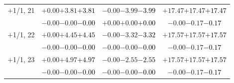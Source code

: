 \documentclass[compress]{beamer}
\begin{document}
\begin{frame}
\begin{tabular}{r | c | c | c}
$+$1/1, 21 & $+0.00$\hspace{0.1 cm}$+3.81$\hspace{0.1 cm}\textcolor{black}{$+3.81$} & $-0.00$\hspace{0.1 cm}$-3.99$\hspace{0.1 cm}\textcolor{black}{$-3.99$} & $+17.47$\hspace{0.1 cm}$+17.47$\hspace{0.1 cm}\textcolor{black}{$+17.47$} \\
           & $-0.00$\hspace{0.1 cm}$-0.00$\hspace{0.1 cm}\textcolor{black}{$-0.00$} & $+0.00$\hspace{0.1 cm}$+0.00$\hspace{0.1 cm}\textcolor{black}{$+0.00$} & $-0.00$\hspace{0.1 cm}$-0.17$\hspace{0.1 cm}\textcolor{black}{$-0.17$} \\
$+$1/1, 22 & $+0.00$\hspace{0.1 cm}$+4.45$\hspace{0.1 cm}\textcolor{black}{$+4.45$} & $-0.00$\hspace{0.1 cm}$-3.32$\hspace{0.1 cm}\textcolor{black}{$-3.32$} & $+17.57$\hspace{0.1 cm}$+17.57$\hspace{0.1 cm}\textcolor{black}{$+17.57$} \\
           & $-0.00$\hspace{0.1 cm}$-0.00$\hspace{0.1 cm}\textcolor{black}{$-0.00$} & $-0.00$\hspace{0.1 cm}$-0.00$\hspace{0.1 cm}\textcolor{black}{$-0.00$} & $-0.00$\hspace{0.1 cm}$-0.17$\hspace{0.1 cm}\textcolor{black}{$-0.17$} \\
$+$1/1, 23 & $+0.00$\hspace{0.1 cm}$+4.97$\hspace{0.1 cm}\textcolor{black}{$+4.97$} & $-0.00$\hspace{0.1 cm}$-2.55$\hspace{0.1 cm}\textcolor{black}{$-2.55$} & $+17.57$\hspace{0.1 cm}$+17.57$\hspace{0.1 cm}\textcolor{black}{$+17.57$} \\
           & $-0.00$\hspace{0.1 cm}$-0.00$\hspace{0.1 cm}\textcolor{black}{$-0.00$} & $-0.00$\hspace{0.1 cm}$-0.00$\hspace{0.1 cm}\textcolor{black}{$-0.00$} & $-0.00$\hspace{0.1 cm}$-0.17$\hspace{0.1 cm}\textcolor{black}{$-0.17$} \\

\end{tabular}
\end{frame}
\end{document}
